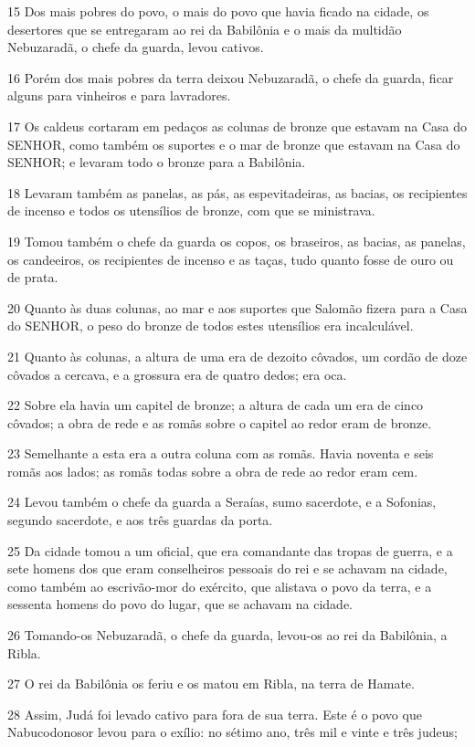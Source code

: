 \par 15 Dos mais pobres do povo, o mais do povo que havia ficado na cidade, os desertores que se entregaram ao rei da Babilônia e o mais da multidão Nebuzaradã, o chefe da guarda, levou cativos.
\par 16 Porém dos mais pobres da terra deixou Nebuzaradã, o chefe da guarda, ficar alguns para vinheiros e para lavradores.
\par 17 Os caldeus cortaram em pedaços as colunas de bronze que estavam na Casa do SENHOR, como também os suportes e o mar de bronze que estavam na Casa do SENHOR; e levaram todo o bronze para a Babilônia.
\par 18 Levaram também as panelas, as pás, as espevitadeiras, as bacias, os recipientes de incenso e todos os utensílios de bronze, com que se ministrava.
\par 19 Tomou também o chefe da guarda os copos, os braseiros, as bacias, as panelas, os candeeiros, os recipientes de incenso e as taças, tudo quanto fosse de ouro ou de prata.
\par 20 Quanto às duas colunas, ao mar e aos suportes que Salomão fizera para a Casa do SENHOR, o peso do bronze de todos estes utensílios era incalculável.
\par 21 Quanto às colunas, a altura de uma era de dezoito côvados, um cordão de doze côvados a cercava, e a grossura era de quatro dedos; era oca.
\par 22 Sobre ela havia um capitel de bronze; a altura de cada um era de cinco côvados; a obra de rede e as romãs sobre o capitel ao redor eram de bronze.
\par 23 Semelhante a esta era a outra coluna com as romãs. Havia noventa e seis romãs aos lados; as romãs todas sobre a obra de rede ao redor eram cem.
\par 24 Levou também o chefe da guarda a Seraías, sumo sacerdote, e a Sofonias, segundo sacerdote, e aos três guardas da porta.
\par 25 Da cidade tomou a um oficial, que era comandante das tropas de guerra, e a sete homens dos que eram conselheiros pessoais do rei e se achavam na cidade, como também ao escrivão-mor do exército, que alistava o povo da terra, e a sessenta homens do povo do lugar, que se achavam na cidade.
\par 26 Tomando-os Nebuzaradã, o chefe da guarda, levou-os ao rei da Babilônia, a Ribla.
\par 27 O rei da Babilônia os feriu e os matou em Ribla, na terra de Hamate.
\par 28 Assim, Judá foi levado cativo para fora de sua terra. Este é o povo que Nabucodonosor levou para o exílio: no sétimo ano, três mil e vinte e três judeus;
